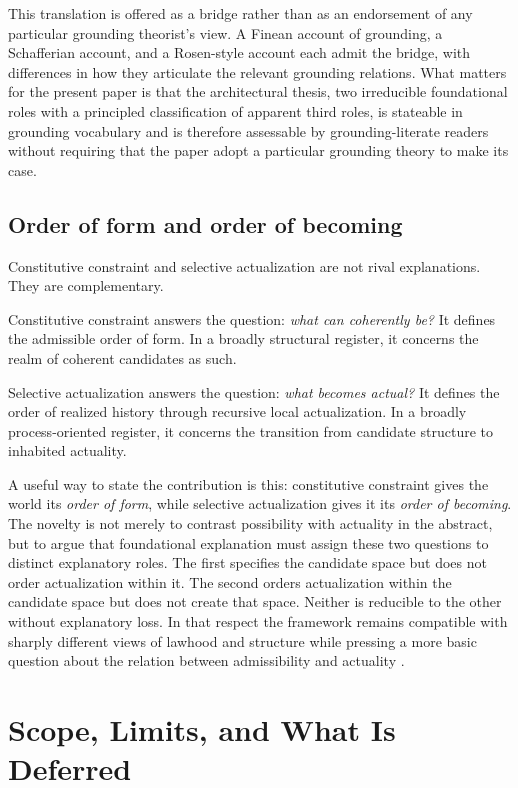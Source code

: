 \documentclass[11pt]{article}
\theoremstyle{foundation}
\begin{document}
This translation is offered as a bridge rather than as an endorsement of any particular grounding theorist's view. A Finean account of grounding, a Schafferian account, and a Rosen-style account each admit the bridge, with differences in how they articulate the relevant grounding relations. What matters for the present paper is that the architectural thesis, two irreducible foundational roles with a principled classification of apparent third roles, is stateable in grounding vocabulary and is therefore assessable by grounding-literate readers without requiring that the paper adopt a particular grounding theory to make its case.

\subsection{Order of form and order of becoming}

Constitutive constraint and selective actualization are not rival explanations. They are complementary.

Constitutive constraint answers the question: \emph{what can coherently be?} It defines the admissible order of form. In a broadly structural register, it concerns the realm of coherent candidates as such.

Selective actualization answers the question: \emph{what becomes actual?} It defines the order of realized history through recursive local actualization. In a broadly process-oriented register, it concerns the transition from candidate structure to inhabited actuality.

A useful way to state the contribution is this: constitutive constraint gives the world its \emph{order of form}, while selective actualization gives it its \emph{order of becoming}. The novelty is not merely to contrast possibility with actuality in the abstract, but to argue that foundational explanation must assign these two questions to distinct explanatory roles. The first specifies the candidate space but does not order actualization within it. The second orders actualization within the candidate space but does not create that space. Neither is reducible to the other without explanatory loss. In that respect the framework remains compatible with sharply different views of lawhood and structure while pressing a more basic question about the relation between admissibility and actuality \citep{Armstrong1983,vanFraassen1989,Maudlin2007,French2014}.

\section{Scope, Limits, and What Is Deferred}
\end{document}
